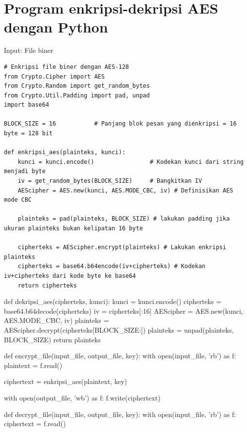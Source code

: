 \documentclass{article}
\begin{document}
\newpage


\section*{Program enkripsi-dekripsi AES dengan Python}
Input: File biner

\vspace{10mm}

\begin{verbatim}
# Enkripsi file biner dengan AES-128
from Crypto.Cipher import AES
from Crypto.Random import get_random_bytes
from Crypto.Util.Padding import pad, unpad
import base64

BLOCK_SIZE = 16           # Panjang blok pesan yang dienkripsi = 16 byte = 128 bit

def enkripsi_aes(plainteks, kunci):
    kunci = kunci.encode()                # Kodekan kunci dari string menjadi byte
    iv = get_random_bytes(BLOCK_SIZE)     # Bangkitkan IV
    AEScipher = AES.new(kunci, AES.MODE_CBC, iv) # Definisikan AES mode CBC

    plainteks = pad(plainteks, BLOCK_SIZE) # lakukan padding jika ukuran plainteks bukan kelipatan 16 byte

    cipherteks = AEScipher.encrypt(plainteks) # Lakukan enkripsi plainteks
    cipherteks = base64.b64encode(iv+cipherteks) # Kodekan iv+cipherteks dari kode byte ke base64
    return cipherteks
\end{verbatim}

\newpage


\vspace{243.54mm}

def dekripsi\_aes(cipherteks, kunci):
    kunci = kunci.encode()
    cipherteks = base64.b64decode(cipherteks)
    iv = cipherteks[:16]
    AEScipher = AES.new(kunci, AES.MODE\_CBC, iv)
    plainteks = AEScipher.decrypt(cipherteks[BLOCK\_SIZE:])
    plainteks = unpad(plainteks, BLOCK\_SIZE)
    return plainteks

def encrypt\_file(input\_file, output\_file, key):
    with open(input\_file, 'rb') as f:
        plaintext = f.read()

    ciphertext = enkripsi\_aes(plaintext, key)

    with open(output\_file, 'wb') as f:
        f.write(ciphertext)

def decrypt\_file(input\_file, output\_file, key):
    with open(input\_file, 'rb') as f:
        ciphertext = f.read()
\end{document}
